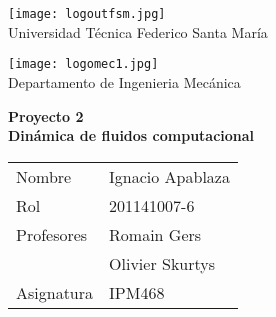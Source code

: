 \documentclass[12pt, a4paper]{article}
\begin{document}
\thispagestyle{empty}

\hspace{-5mm}
\begin{minipage}[c]{7cm}
\centering
\texttt{[image: logoutfsm.jpg]} \\
Universidad Técnica Federico Santa María
\end{minipage}
\hfill
\hspace{20mm}
\begin{minipage}[c]{7cm}
\centering
\texttt{[image: logomec1.jpg]} \\
Departamento de Ingenieria Mecánica
\end{minipage}

\begin{center}
\vfill
 \Huge{{\bf Proyecto 2 }} \\ 
 \Huge{ {\bf Dinámica de fluidos computacional}} \\
\vfill
\end{center}

\vfill \hfill
\begin{tabular}{l @{ : } l}
Nombre &   Ignacio Apablaza \\
Rol & 201141007-6  \\
Profesores & Romain Gers \\
			& Olivier Skurtys \\
Asignatura & IPM468 \\
\end{tabular}

\newpage


\tableofcontents


\newpage


\newpage


\newpage


\newpage


\newpage


\newpage

%
\end{document}
